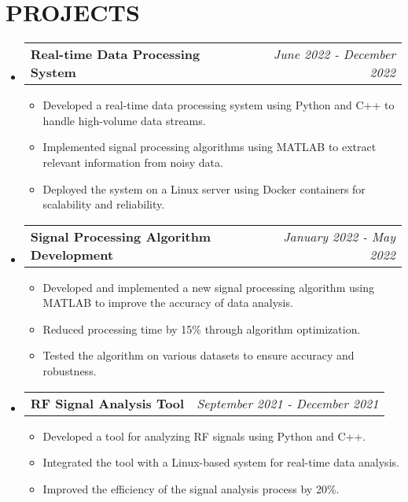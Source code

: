 \documentclass[letterpaper,11pt]{article}
\makeatletter
\newcommand{\resumeItem}[1]{\item\small{{#1 \vspace{-3pt}}}}
\newcommand{\resumeProjectHeading}[2]{\item\begin{tabular*}{0.97\textwidth}{l@{\extracolsep{\fill}}r}\small#1 & #2 \\ \end{tabular*}\vspace{-7pt}}
\newcommand{\resumeSubHeadingListStart}{\begin{itemize}[leftmargin=0.15in, label={}]}
\newcommand{\resumeSubHeadingListEnd}{\end{itemize}}
\newcommand{\resumeItemListStart}{\begin{itemize}}
\newcommand{\resumeItemListEnd}{\end{itemize}\vspace{-5pt}}
\makeatother
\begin{document}
\section{{\fontsize{9pt}{20pt}\selectfont \textbf{PROJECTS}}}\resumeSubHeadingListStart
\resumeProjectHeading{\textbf{Real-time Data Processing System}}{\textit{June 2022 - December 2022}}
\resumeItemListStart
\resumeItem{Developed a real-time data processing system using Python and C++ to handle high-volume data streams.}
\resumeItem{Implemented signal processing algorithms using MATLAB to extract relevant information from noisy data.}
\resumeItem{Deployed the system on a Linux server using Docker containers for scalability and reliability.}
\resumeItemListEnd\vspace{-6pt}
\resumeProjectHeading{\textbf{Signal Processing Algorithm Development}}{\textit{January 2022 - May 2022}}
\resumeItemListStart
\resumeItem{Developed and implemented a new signal processing algorithm using MATLAB to improve the accuracy of data analysis.}
\resumeItem{Reduced processing time by 15\% through algorithm optimization.}
\resumeItem{Tested the algorithm on various datasets to ensure accuracy and robustness.}
\resumeItemListEnd\vspace{-6pt}
\resumeProjectHeading{\textbf{RF Signal Analysis Tool}}{\textit{September 2021 - December 2021}}
\resumeItemListStart
\resumeItem{Developed a tool for analyzing RF signals using Python and C++.}
\resumeItem{Integrated the tool with a Linux-based system for real-time data analysis.}
\resumeItem{Improved the efficiency of the signal analysis process by 20\%.}
\resumeItemListEnd
\resumeSubHeadingListEnd\vspace{-17pt}
\end{document}
